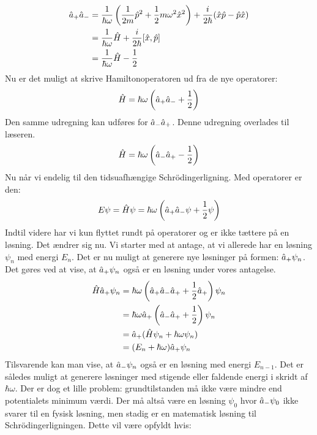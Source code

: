 \documentclass[../Kvantemekanik.tex]{subfiles}
\begin{document}
\begin{align*}
\hat a_+\hat a_- &= \frac{1}{\hbar \omega}\left( \frac{1}{2m}\hat p^2+\frac{1}{2}m\omega^2 \hat x^2\right)+\frac{i}{2\hbar}(\hat x\hat p-\hat p\hat x)\\
&= \frac{1}{\hbar \omega}\hat H+\frac{i}{2 \hbar}[\hat x,\hat p]\\
&= \frac{1}{\hbar \omega}\hat H-\frac{1}{2}
\end{align*}
Nu er det muligt at skrive Hamiltonoperatoren ud fra de nye operatorer:
\begin{equation}
\hat H = \hbar \omega\left(\hat a_+\hat a_-+\frac{1}{2}\right)
\end{equation}
Den samme udregning kan udføres for $\hat a_- \hat a_+$. Denne udregning overlades til læseren.
\begin{equation}
\hat H = \hbar \omega\left(\hat a_-\hat a_+ -\frac{1}{2}\right)
\label{kvant:eq:Hamap}
\end{equation}
Nu når vi endelig til den tidsuafhængige Schrödingerligning. Med operatorer er den:
\begin{equation}
E\psi = \hat H \psi = \hbar\omega \left(\hat a_+\hat a_-\psi+\frac{1}{2}\psi\right)
\end{equation}
Indtil videre har vi kun flyttet rundt på operatorer og er ikke tættere på en løsning. Det ændrer sig nu. Vi starter med at antage, at vi allerede har en løsning $\psi_n$ med energi $E_n$. Det er nu muligt at generere nye løsninger på formen: $\hat a_+\psi_n$. Det gøres ved at vise, at $\hat a_+\psi_n$ også er en løsning under vores antagelse.
\begin{align}
\nonumber\hat H \hat a_+ \psi_n &= \hbar\omega\left(\hat a_+\hat a_-\hat a_++\frac{1}{2}\hat a_+\right)\psi_n\\
\nonumber &= \hbar\omega\hat a_+\left(\hat a_-\hat a_+ +\frac{1}{2}\right)\psi_n\\
\nonumber &=\hat a_+(\hat H\psi_n + \hbar\omega\psi_n)\\
&= (E_n+\hbar\omega)\hat a_+ \psi_n
\end{align}
Tilsvarende kan man vise, at $\hat a_-\psi_n$ også er en løsning med energi $E_{n-1}$. Det er således muligt at generere løsninger med stigende eller faldende energi  i skridt af $\hbar \omega$. Der er dog et lille problem: grundtilstanden må ikke være mindre end potentialets minimum værdi. Der må altså være en løsning $\psi_0$ hvor $\hat a_-\psi_0$ ikke svarer til en fysisk løsning, men stadig er en matematisk løsning til Schrödingerligningen. Dette vil være opfyldt hvis:
\end{document}
